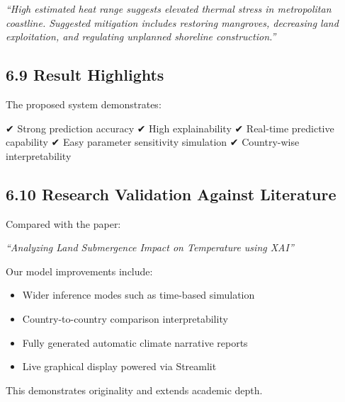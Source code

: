 \documentclass[12pt, a4paper]{article}
\begin{document}
\textit{“High estimated heat range suggests elevated thermal stress in metropolitan coastline. Suggested mitigation includes restoring mangroves, decreasing land exploitation, and regulating unplanned shoreline construction.”}


\subsection{\textbf{6.9 Result Highlights}}

The proposed system demonstrates:

✔ Strong prediction accuracy  
✔ High explainability  
✔ Real-time predictive capability  
✔ Easy parameter sensitivity simulation  
✔ Country-wise interpretability  


\subsection{\textbf{6.10 Research Validation Against Literature}}

Compared with the paper:

\textit{“Analyzing Land Submergence Impact on Temperature using XAI”}

Our model improvements include:

\begin{itemize}
    \item Wider inference modes such as time-based simulation
    \item Country-to-country comparison interpretability
    \item Fully generated automatic climate narrative reports
    \item Live graphical display powered via Streamlit
\end{itemize}

This demonstrates originality and extends academic depth.


\begin{center}
\end{center}

\newpage
\end{document}
